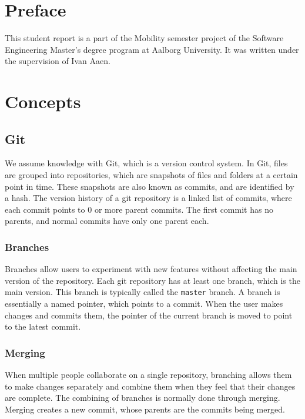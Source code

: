 \chapter*{Preface}
This student report is a part of the Mobility semester project of the Software Engineering Master's degree program at Aalborg University.
It was written under the supervision of Ivan Aaen.


\listoftodos{}

\chapter*{Concepts}

\section*{Git}

We assume knowledge with Git\cite{git}, which is a version control system.
In Git, files are grouped into repositories, which are snapshots of files and folders at a certain point in time.
These snapshots are also known as commits, and are identified by a hash.
The version history of a git repository is a linked list of commits, where each commit points to 0 or more parent commits.
The first commit has no parents, and normal commits have only one parent each.

\subsection*{Branches}
Branches allow users to experiment with new features without affecting the main version of the repository.
Each git repository has at least one branch, which is the main version.
This branch is typically called the \texttt{master} branch.
A branch is essentially a named pointer, which points to a commit.
When the user makes changes and commits them, the pointer of the current branch is moved to point to the latest commit.

\subsection*{Merging}
When multiple people collaborate on a single repository, branching allows them to make changes separately and combine them when they feel that their changes are complete.
The combining of branches is normally done through merging.
Merging creates a new commit, whose parents are the commits being merged.

